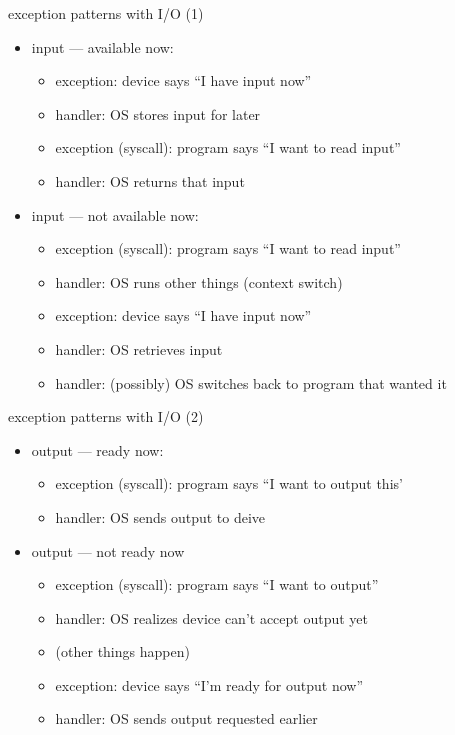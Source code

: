 \begin{frame}{exception patterns with I/O (1)}
    \begin{itemize}
    \item input --- available now:
        \begin{itemize}
        \item exception: device says ``I have input now''
        \item handler: OS stores input for later
        \item exception (syscall): program says ``I want to read input''
        \item handler: OS returns that input
        \end{itemize}
    \item input --- not available now:
        \begin{itemize}
        \item exception (syscall): program says ``I want to read input''
        \item handler: OS runs other things (context switch)
        \item exception: device says ``I have input now''
        \item handler: OS retrieves input
        \item handler: (possibly) OS switches back to program that wanted it
        \end{itemize}
    \end{itemize}
\end{frame}

\begin{frame}{exception patterns with I/O (2)}
    \begin{itemize}
    \item output --- ready now:
        \begin{itemize}
        \item exception (syscall): program says ``I want to output this'
        \item handler: OS sends output to deive
        \end{itemize}
    \item output --- not ready now
        \begin{itemize}
        \item exception (syscall): program says ``I want to output''
        \item handler: OS realizes device can't accept output yet
        \item (other things happen)
        \item exception: device says ``I'm ready for output now''
        \item handler: OS sends output requested earlier
        \end{itemize}
    \end{itemize}
\end{frame}
